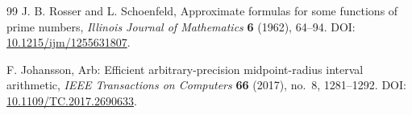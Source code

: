 \begin{thebibliography}{99}
 J. B. Rosser and L. Schoenfeld,
Approximate formulas for some functions of prime numbers,
\emph{Illinois Journal of Mathematics} \textbf{6} (1962), 64--94.
DOI: \href{https://doi.org/10.1215/ijm/1255631807}{10.1215/ijm/1255631807}.

 F. Johansson,
Arb: Efficient arbitrary-precision midpoint-radius interval arithmetic,
\emph{IEEE Transactions on Computers} \textbf{66} (2017), no.~8,
1281--1292.
DOI: \href{https://doi.org/10.1109/TC.2017.2690633}{10.1109/TC.2017.2690633}.

\end{thebibliography}
